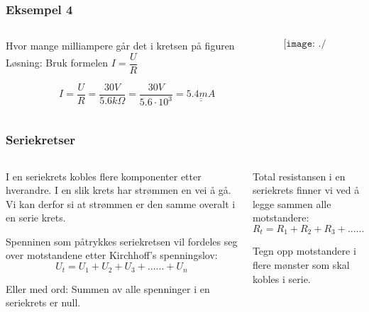 \documentclass[aspectratio=169,xcolor=dvipsnames]{beamer}
\begin{document}
\begin{frame}
	\frametitle{Eksempel 4}

	\begin{columns}
		\begin{column}{0.5\textwidth}
Hvor mange milliampere går det i kretsen på figuren 
\vskip 0.5cm
Løsning: Bruk formelen $I=\dfrac{U}{R}$

\[
I=\dfrac{U}{R}=\dfrac{30V}{5.6k\Omega}=\dfrac{30V}{5.6\cdot10^{3}}=\underline{\underline{5.4mA}}
\]
		\end{column}

		\begin{column}{0.5\textwidth}
			$$\texttt{[image: ./Eksempel4.pdf]}$$
		\end{column}
	\end{columns}
\end{frame}
\begin{frame}
	\frametitle{Seriekretser}

	\begin{columns}
		\begin{column}{0.5\textwidth}
I en seriekrets kobles flere komponenter etter hverandre. I en slik
krets har strømmen en vei å gå. Vi kan derfor si at strømmen er den
samme overalt i en serie krets. 

Spenninen som påtrykkes seriekretsen vil fordeles seg over motstandene
etter Kirchhoff's spenningslov:
\[
U_{t}=U_{1}+U_{2}+U_{3}+......+U_{n}
\]

Eller med ord: Summen av alle spenninger i en seriekrets er null.

		\end{column}

		\begin{column}{0.5\textwidth}

Total resistansen i en seriekrets finner vi ved å legge sammen alle
motstandere:
\[
R_{t}=R_{1}+R_{2}+R_{3}+......+R_{n}
\]

Tegn opp motstandere i flere mønster som skal kobles i serie.
		\end{column}
	\end{columns}
\end{frame}
\end{document}
